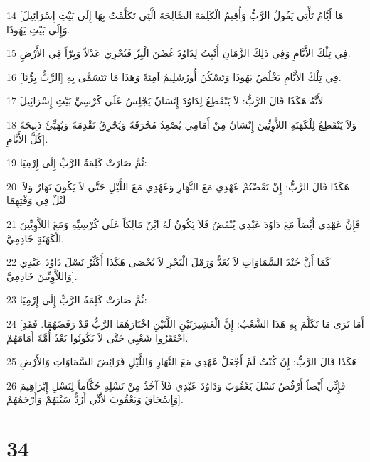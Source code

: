 \par 14 [هَا أَيَّامٌ تَأْتِي يَقُولُ الرَّبُّ وَأُقِيمُ الْكَلِمَةَ الصَّالِحَةَ الَّتِي تَكَلَّمْتُ بِهَا إِلَى بَيْتِ إِسْرَائِيلَ وَإِلَى بَيْتِ يَهُوذَا.
\par 15 فِي تِلْكَ الأَيَّامِ وَفِي ذَلِكَ الزَّمَانِ أُنْبِتُ لِدَاوُدَ غُصْنَ الْبِرِّ فَيُجْرِي عَدْلاً وَبِرّاً فِي الأَرْضِ.
\par 16 فِي تِلْكَ الأَيَّامِ يَخْلُصُ يَهُوذَا وَتَسْكُنُ أُورُشَلِيمُ آمِنَةً وَهَذَا مَا تَتَسَمَّى بِهِ [الرَّبُّ بِرُّنَا].
\par 17 لأَنَّهُ هَكَذَا قَالَ الرَّبُّ: لاَ يَنْقَطِعُ لِدَاوُدَ إِنْسَانٌ يَجْلِسُ عَلَى كُرْسِيِّ بَيْتِ إِسْرَائِيلَ
\par 18 وَلاَ يَنْقَطِعُ لِلْكَهَنَةِ اللاَّوِيِّينَ إِنْسَانٌ مِنْ أَمَامِي يُصْعِدُ مُحْرَقَةً وَيُحْرِقُ تَقْدِمَةً وَيُهَيِّئُ ذَبِيحَةً كُلَّ الأَيَّامِ].
\par 19 ثُمَّ صَارَتْ كَلِمَةُ الرَّبِّ إِلَى إِرْمِيَا:
\par 20 [هَكَذَا قَالَ الرَّبُّ: إِنْ نَقَضْتُمْ عَهْدِي مَعَ النَّهَارِ وَعَهْدِي مَعَ اللَّيْلِ حَتَّى لاَ يَكُونَ نَهَارٌ وَلاَ لَيْلٌ فِي وَقْتِهِمَا
\par 21 فَإِنَّ عَهْدِي أَيْضاً مَعَ دَاوُدَ عَبْدِي يُنْقَضُ فَلاَ يَكُونُ لَهُ ابْنٌ مَالِكاً عَلَى كُرْسِيِّهِ وَمَعَ اللاَّوِيِّينَ الْكَهَنَةِ خَادِمِيَّ.
\par 22 كَمَا أَنَّ جُنْدَ السَّمَاوَاتِ لاَ يُعَدُّ وَرَمْلَ الْبَحْرِ لاَ يُحْصَى هَكَذَا أُكَثِّرُ نَسْلَ دَاوُدَ عَبْدِي وَاللاَّوِيِّينَ خَادِمِيَّ].
\par 23 ثُمَّ صَارَتْ كَلِمَةُ الرَّبِّ إِلَى إِرْمِيَا:
\par 24 [أَمَا تَرَى مَا تَكَلَّمَ بِهِ هَذَا الشَّعْبُ: إِنَّ الْعَشِيرَتَيْنِ اللَّتَيْنِ اخْتَارَهُمَا الرَّبُّ قَدْ رَفَضَهُمَا. فَقَدِ احْتَقَرُوا شَعْبِي حَتَّى لاَ يَكُونُوا بَعْدُ أُمَّةً أَمَامَهُمْ.
\par 25 هَكَذَا قَالَ الرَّبُّ: إِنْ كُنْتُ لَمْ أَجْعَلْ عَهْدِي مَعَ النَّهَارِ وَاللَّيْلِ فَرَائِضَ السَّمَاوَاتِ وَالأَرْضِ
\par 26 فَإِنِّي أَيْضاً أَرْفُضُ نَسْلَ يَعْقُوبَ وَدَاوُدَ عَبْدِي فَلاَ آخُذُ مِنْ نَسْلِهِ حُكَّاماً لِنَسْلِ إِبْرَاهِيمَ وَإِسْحَاقَ وَيَعْقُوبَ لأَنِّي أَرُدُّ سَبْيَهُمْ وَأَرْحَمُهُمْ].

\chapter{34}

